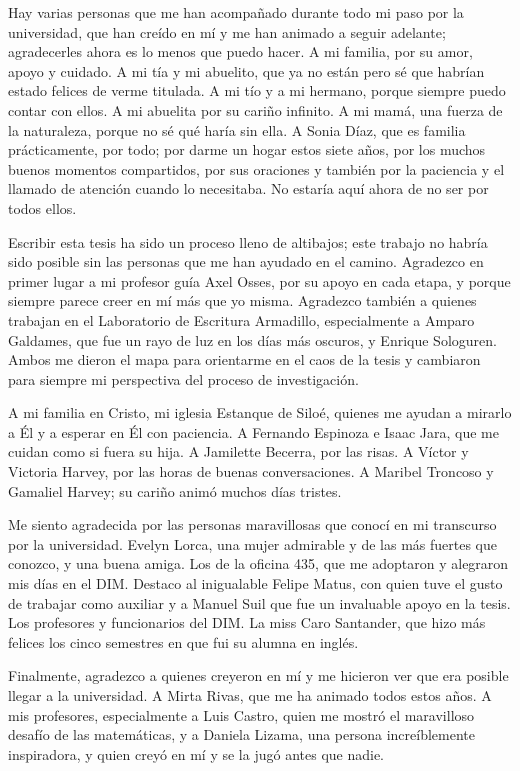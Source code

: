 \documentclass[upright, contnum]{umemoria}
\begin{document}
\begin{thanks}

Hay varias personas que me han acompañado durante todo mi paso por la universidad, que han creído en mí y me han animado a seguir adelante; agradecerles ahora es lo menos que puedo hacer. A mi familia, por su amor, apoyo y cuidado. A mi tía y mi abuelito, que ya no están pero sé que habrían estado felices de verme titulada. A mi tío y a mi hermano, porque siempre puedo contar con ellos. A mi abuelita por su cariño infinito. A mi mamá, una fuerza de la naturaleza, porque no sé qué haría sin ella. A Sonia Díaz, que es familia prácticamente, por todo; por darme un hogar estos siete años, por los muchos buenos momentos compartidos, por sus oraciones y también por la paciencia y el llamado de atención cuando lo necesitaba. No estaría aquí ahora de no ser por todos ellos.

Escribir esta tesis ha sido un proceso lleno de altibajos; este trabajo no habría sido posible sin las personas que me han ayudado en el camino. Agradezco en primer lugar a mi profesor guía Axel Osses, por su apoyo en cada etapa, y porque siempre parece creer en mí más que yo misma. Agradezco también a quienes trabajan en el Laboratorio de Escritura Armadillo, especialmente a Amparo Galdames, que fue un rayo de luz en los días más oscuros, y Enrique Sologuren. Ambos me dieron el mapa para orientarme en el caos de la tesis y cambiaron para siempre mi perspectiva del proceso de investigación.

A mi familia en Cristo, mi iglesia Estanque de Siloé, quienes me ayudan a mirarlo a Él y a esperar en Él con paciencia. A Fernando Espinoza e Isaac Jara, que me cuidan como si fuera su hija. A Jamilette Becerra, por las risas. A Víctor y Victoria Harvey, por las horas de buenas conversaciones. A Maribel Troncoso y Gamaliel Harvey; su cariño animó muchos días tristes.


Me siento agradecida por las personas maravillosas que conocí en mi transcurso por la universidad. Evelyn Lorca, una mujer admirable y de las más fuertes que conozco, y una buena amiga. Los de la oficina 435, que me adoptaron y alegraron mis días en el DIM. Destaco al inigualable Felipe Matus, con quien tuve el gusto de trabajar como auxiliar y a Manuel Suil que fue un invaluable apoyo en la tesis. Los profesores y funcionarios del DIM. La miss Caro Santander, que hizo más felices los cinco semestres en que fui su alumna en inglés. 

Finalmente, agradezco a quienes creyeron en mí y me hicieron ver que era posible llegar a la universidad. A Mirta Rivas, que me ha animado todos estos años. A mis profesores, especialmente a Luis Castro, quien me mostró el maravilloso desafío de las matemáticas, y a Daniela Lizama, una persona increíblemente inspiradora, y quien creyó en mí y se la jugó antes que nadie. 


\end{thanks}
\end{document}
